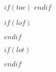 

$if(toc)$
\renewcommand*\contentsname{Table des matieres}
\tableofcontents
$endif$

\newpage

$if(lof)$
\renewcommand\listfigurename{Liste des figures}
\listoffigures
$endif$

$if(lot)$
\renewcommand\listtablename{Liste des tableaux}
\listoftables
$endif$

\newpage
{}
\setcounter{page}{1}